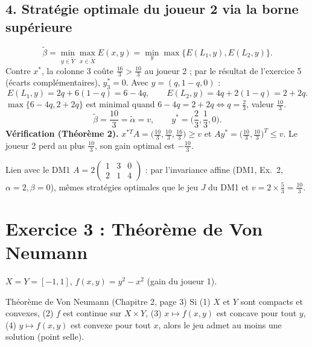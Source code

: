 \documentclass[11pt,a4paper]{article}
\newcommand{\Xt}{\tilde{X}}
\newcommand{\Yt}{\tilde{Y}}
\begin{document}
\subsection*{4. Stratégie optimale du joueur 2 via la borne supérieure}
\[
\tilde\beta=\min_{y\in\Yt}\max_{x\in\Xt}E(x,y)=\min_{y}\max\{E(L_1,y),E(L_2,y)\}.
\]
Contre $x^*$, la colonne 3 coûte $\frac{16}{3}>\frac{10}{3}$ au joueur 2 ; par le résultat de l'exercice 5 (écarts complémentaires), $y_3^*=0$. Avec $y=(q,1-q,0)$ :
\[
E(L_1,y)=2q+6(1-q)=6-4q,\qquad E(L_2,y)=4q+2(1-q)=2+2q.
\]
$\max\{6-4q,2+2q\}$ est minimal quand $6-4q=2+2q\iff q=\tfrac23$, valeur $\tfrac{10}{3}$.
\[
\boxed{\tilde\beta=\frac{10}{3}=\tilde\alpha=v,\qquad y^*=\Big(\frac23,\frac13,0\Big).}
\]
\textbf{Vérification (Théorème 2).} $x^{*T}A=\big(\tfrac{10}{3},\tfrac{10}{3},\tfrac{16}{3}\big)\ge v$ et $Ay^*=\big(\tfrac{10}{3},\tfrac{10}{3}\big)^T\le v$. Le joueur 2 perd au plus $\tfrac{10}{3}$, son gain optimal est $-\tfrac{10}{3}$.

\begin{rembox}{Lien avec le DM1}
$A=2\begin{pmatrix}1&3&0\\2&1&4\end{pmatrix}$ : par l'invariance affine (DM1, Ex.~2, $\alpha=2,\beta=0$), mêmes stratégies optimales que le jeu $J$ du DM1 et $v=2\times\frac53=\frac{10}{3}$.
\end{rembox}

\section*{Exercice 3 : Théorème de Von Neumann}

$X=Y=[-1,1]$, $f(x,y)=y^2-x^2$ (gain du joueur 1).

\begin{propbox}{Théorème de Von Neumann (Chapitre 2, page 3)}
Si (1) $X$ et $Y$ sont compacts et convexes, (2) $f$ est continue sur $X\times Y$, (3) $x\mapsto f(x,y)$ est concave pour tout $y$, (4) $y\mapsto f(x,y)$ est convexe pour tout $x$, alors le jeu admet au moins une solution (point selle).
\end{propbox}
\end{document}
